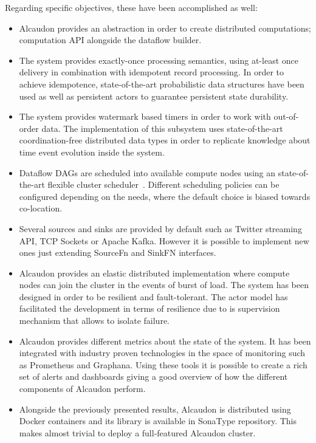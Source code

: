 Regarding specific objectives, these have been accomplished as well:
%
\begin{itemize}
\item Alcaudon provides an abstraction in order to create distributed
  computations; computation \acs{API} alongside the dataflow builder.
\item The system provides exactly-once processing semantics, using at-least once
  delivery in combination with idempotent record processing. In order to achieve
  idempotence, state-of-the-art probabilistic data structures have been used as
  well as persistent actors to guarantee persistent state durability.
\item The system provides watermark based timers in order to work with
  out-of-order data. The implementation of this subsystem uses state-of-the-art
  coordination-free distributed data types in order to replicate knowledge about
  time event evolution inside the system.
\item Dataflow \acs{DAG}s are scheduled into available compute nodes using an
  state-of-the-art flexible cluster scheduler~\cite{firmament}. Different scheduling
  policies can be configured depending on the needs, where the default choice is
  biased towards co-location.
\item Several sources and sinks are provided by default such as Twitter streaming
  API, TCP Sockets or Apache Kafka. However it is possible to implement new ones
  just extending SourceFn and SinkFN interfaces.
\item Alcaudon provides an elastic distributed implementation where compute
  nodes can join the cluster in the events of burst of load. The system has been
  designed in order to be resilient and fault-tolerant. The actor model has
  facilitated the development in terms of resilience due to is supervision mechanism that
  allows to isolate failure.
\item Alcaudon provides different metrics about the state of the system. It has been
  integrated with industry proven technologies in the space of monitoring such as
  Prometheus and Graphana. Using these tools it is possible to create a rich set
  of alerts and dashboards giving a good overview of how the different components
  of Alcaudon perform.
\item Alongside the previously presented results, Alcaudon is distributed using Docker
  containers and its library is available in SonaType repository. This makes almost
  trivial to deploy a full-featured Alcaudon cluster.
\end{itemize}

